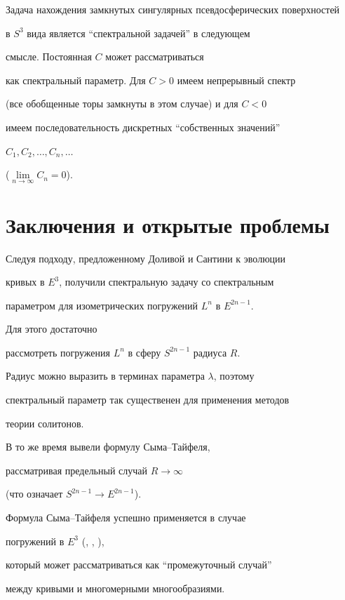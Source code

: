 Задача нахождения замкнутых сингулярных псевдосферических поверхностей


в $S^3$ вида  является ``спектральной задачей'' в следующем 


смысле. Постоянная $C$ может рассматриваться


как спектральный параметр. Для $C>0$ имеем непрерывный спектр 


(все обобщенные торы замкнуты в этом случае) и для $C<0$


имеем последовательность дискретных ``собственных значений''


$C_1,C_2,\dotsc,C_n,\dotsc$


($\lim\limits_{n\rightarrow \infty} C_n = 0$).








\section{Заключения и открытые проблемы}





Следуя подходу, предложенному Доливой и Сантини к эволюции


кривых в $E^3$, получили спектральную задачу со спектральным


параметром для изометрических погружений $L^n$ в $E^{2n-1}$.


Для этого достаточно


рассмотреть погружения $L^n$ в сферу $S^{2n-1}$ радиуса $R$.


Радиус можно выразить в терминах параметра $\lambda$, поэтому


спектральный параметр так существенен для применения методов


теории солитонов.


В то же время вывели формулу Сыма--Тайфеля,


рассматривая предельный случай $R\rightarrow \infty$


(что означает $S^{2n-1} \rightarrow E^{2n-1}$).


Формула Сыма--Тайфеля успешно применяется в случае


погружений в $E^3$ (\cite{Sym}, \cite{Ci-FG}, \cite{Bob}),


который может рассматриваться как ``промежуточный случай''


между кривыми и многомерными многообразиями.





